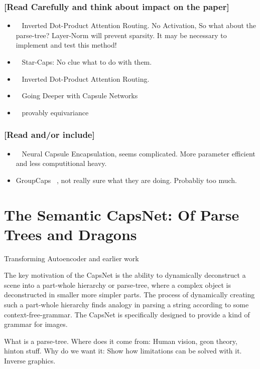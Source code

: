 \documentclass{article}
\begin{document}
\subsubsection*{[Read Carefully and think about impact on the paper]}
\begin{itemize}
	\item ~\cite{iclr/TsaiSGS20} Inverted Dot-Product Attention Routing. No Activation, So what about the parse-tree? Layer-Norm will prevent sparsity. It may be necessary to implement and test this method!
	\item ~\cite{nips/AhmedT19} Star-Caps: No clue what to do with them.
	\item ~\cite{iclr/TsaiSGS20} Inverted Dot-Product Attention Routing.
	\item ~\cite{cvpr/RajasegaranJJJS19} Going Deeper with Capsule Networks
	\item ~\cite{nips/LenssenFL18} provably equivariance
\end{itemize}

\subsubsection*{[Read and/or include]}
\begin{itemize}
	\item ~\cite{eccv/LiGDOW18} Neural Capsule Encapsulation, seems complicated. More parameter efficient and less computitional heavy.
	\item GroupCaps ~\cite{cvpr/ChenJSWS18}, not really sure what they are doing. Probabliy too much.
\end{itemize}

\section{The Semantic CapsNet: Of Parse Trees and Dragons}

Transforming Autoencoder and earlier work

The key motivation of the CapsNet is the ability to dynamically deconstruct a scene into a part-whole hierarchy or parse-tree, where a complex object is deconstructed in smaller more simpler parts.
The process of dynamically creating such a part-whole hierarchy finds analogy in parsing a string according to some context-free-grammar.
The CapsNet is specifically designed to provide a kind of grammar for images.

What is a parse-tree.
Where does it come from: Human vision, geon theory, hinton stuff.
Why do we want it: Show how limitations can be solved with it. Inverse graphics.
\end{document}
